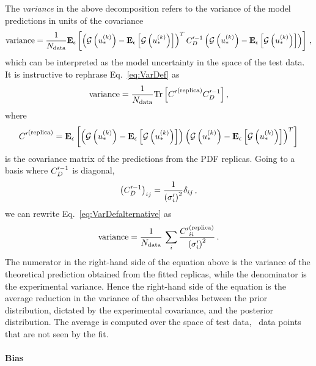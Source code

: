 The {\em variance} in the above decomposition refers to the variance of the
model predictions in units of the covariance
\begin{equation}
    \label{eq:VarDef}
    {\rm variance} = \frac{1}{N_{\rm data}}
    \mathbf{E}_{\epsilon}\left[ 
            \left( \mathcal{G}\left(u_*^{(k)}\right) - 
            \mathbf{E}_{\epsilon}\left[ \mathcal{G}\left(u_*^{(k)}\right) \right] \right)^T
            C_D^{\prime -1}
            \left( \mathcal{G}\left(u_*^{(k)}\right) - 
            \mathbf{E}_{\epsilon}\left[ \mathcal{G}\left(u_*^{(k)}\right) \right] \right)
         \right]\, ,
\end{equation}
which can be interpreted as the model uncertainty in the space of the test data.
It is instructive to rephrase Eq.~\ref{eq:VarDef} as
\begin{equation}
    \label{eq:VarDefalternative}
    {\rm variance} = \frac{1}{N_{\rm data}} {\rm Tr} \left[ {{C}^{\prime}}^{(\rm replica)} C_D^{\prime -1} \right],
\end{equation}
where 
\begin{equation}
    \label{eq:CovRep}
    {{C}^{\prime}}^{(\rm replica)} = 
    \mathbf{E}_{\epsilon}\left[ 
            \left( \mathcal{G}\left(u_*^{(k)}\right) - 
            \mathbf{E}_{\epsilon}\left[ \mathcal{G}\left(u_*^{(k)}\right) \right] \right)
            \left( \mathcal{G}\left(u_*^{(k)}\right) - 
            \mathbf{E}_{\epsilon}\left[ \mathcal{G}\left(u_*^{(k)}\right) \right] \right)^T
         \right]
\end{equation}
is the covariance matrix of the predictions from the PDF replicas. Going to a
basis where $C_D^{\prime -1}$ is diagonal,
\begin{equation}
    \label{eq:InvCovPrimeDiag}
    \left(C_D^{\prime -1} \right)_{ij} = \frac{1}{\left(\sigma'_i\right)^2} 
    \delta_{ij}\, ,
\end{equation}
we can rewrite Eq.~\ref{eq:VarDefalternative} as 
\begin{equation}
    \label{eq:VarianceInterpretation}
    {\rm variance} = \frac{1}{N_{\rm data}}\, \sum_i \frac{{{C}^{\prime}}^{(\rm replica)}_{ii}}{\left(\sigma'_i\right)^2}\, .
\end{equation}
The numerator in the right-hand side of the equation above is the variance of
the theoretical prediction obtained from the fitted replicas, while the
denominator is the experimental variance. Hence the right-hand side of the
equation is the average reduction in the variance of the observables between the
prior distribution, dictated by the experimental covariance, and the posterior
distribution. The average is computed over the space of test data, \ie\ data points that are not seen by the fit. 

\paragraph{Bias}

